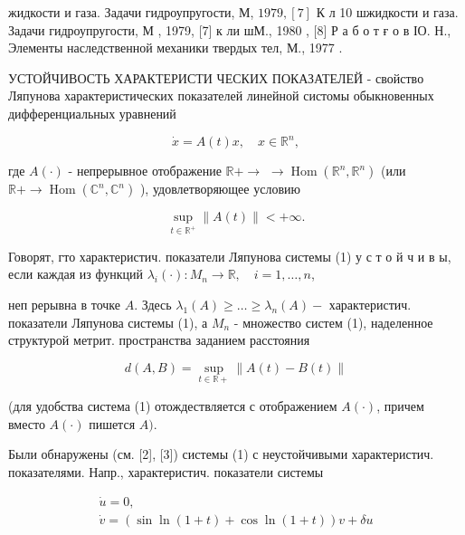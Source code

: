 \documentclass[10pt]{article}
\begin{document}
жидкости и газа. Задачи гидроупругости, М, $1979,[7]$ К л 10 шжидкости и газа. Задачи гидроупругости, М , 1979, [7] к ли шМ., 1980 , [8] Р а б о т ғ о в ІО. Н., Элементы наследственной механики твердых тел, М., 1977 .



УСТОЙЧИВОСТЬ ХАРАКТЕРИСТИ ЧЕСКИХ ПОКАЗАТЕЛЕЙ - свойство Ляпунова характеристических показателей линейной систомы обыкновенных дифференциальных уравнений



\[

\dot{x}=A(t) x, \quad x \in \mathbb{R}^{n},

\]



где $A(\cdot)$ - непрерывное отображение $\mathbb{R}+\longrightarrow$ $\longrightarrow \operatorname{Hom}\left(\mathbb{R}^{n}, \mathbb{R}^{n}\right)$ (или $\mathbb{R}+\longrightarrow \operatorname{Hom}\left(\mathbb{C}^{n}, \mathbb{C}^{n}\right)$ ), удовлетворяющее условию



\[

\sup _{t \in \mathbb{R}^{+}}\|A(t)\|<+\infty .

\]



Говорят, гто характеристич. показатели Ляпунова системы (1) у с т о й ч и в ы, если каждая из функций $\lambda_{i}(\cdot): M_{n} \rightarrow \mathbb{R}, \quad i=1, \ldots, n$,



неп рерывна в точке $A$. Здесь $\lambda_{1}(A) \geqslant \ldots \geqslant \lambda_{n}(A)-$ характеристич. показатели Ляпунова системы (1), а $M_{n}$ - множество систем (1), наделенное структурой метрит. пространства заданием расстояния



\[

d(A, B)=\sup _{t \in \mathbb{R}+}\|A(t)-B(t)\|

\]



(для удобства система (1) отождествляется с отображением $A(\cdot)$, причем вместо $A(\cdot)$ пишется $A)$.



Были обнаружены (см. [2], [3]) системы (1) с неустойчивыми характеристич. показателями. Напр., характеристич. показатели системы



\[

\begin{gathered}

\dot{u}=0, \\

\dot{v}=(\sin \ln (1+t)+\cos \ln (1+t)) v+\delta u

\end{gathered}

\]
\end{document}
